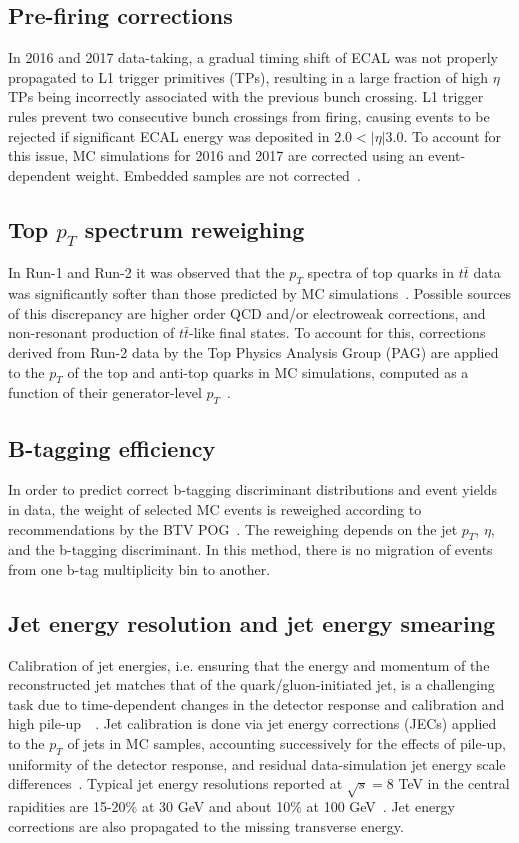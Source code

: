 \subsection{Pre-firing corrections}
In 2016 and 2017 data-taking, a gradual timing shift of ECAL was not properly propagated to L1 trigger primitives (TPs), resulting in a large fraction of high $\eta$ TPs being incorrectly associated with the previous bunch crossing. L1 trigger rules prevent two consecutive bunch crossings from firing, causing events to be rejected if significant ECAL energy was deposited in $2.0 < |\eta| 3.0$. To account for this issue, MC simulations for 2016 and 2017 are corrected using an event-dependent weight. Embedded samples are not corrected~\cite{CMS-HIG-19-010}.

\subsection{Top \texorpdfstring{$p_{T}$}{pT} spectrum reweighing}
In Run-1 and Run-2 it was observed that the $p_{T}$ spectra of top quarks in $t\bar{t}$ data was significantly softer than those predicted by MC simulations~\cite{twiki_Top_pt_reweighing}. Possible sources of this discrepancy are higher order QCD and/or electroweak corrections, and non-resonant production of $t\bar{t}$-like final states. To account for this, corrections derived from Run-2 data by the Top Physics Analysis Group (PAG) are applied to the $p_{T}$ of the top and anti-top quarks in MC simulations, computed as a function of their generator-level $p_{T}$~\cite{twiki_Top_pt_reweighing}.

\subsection{B-tagging efficiency}
In order to predict correct b-tagging discriminant distributions and event yields in data, the weight of selected MC events is reweighed according to recommendations by the BTV POG~\cite{twiki_btag_SF_methods}. The reweighing depends on the jet $p_{T}$, $\eta$, and the b-tagging discriminant. In this method, there is no migration of events from one b-tag multiplicity bin to another.

\subsection{Jet energy resolution and jet energy smearing}
Calibration of jet energies, i.e. ensuring that the energy and momentum of the reconstructed jet matches that of the quark/gluon-initiated jet, is a challenging task due to time-dependent changes in the detector response and calibration and high pile-up~\cite{CMS-JME-13-004}~\cite{proceedings-Agarwal:2022txa}. Jet calibration is done via jet energy corrections (JECs) applied to the $p_{T}$ of jets in MC samples, accounting successively for the effects of pile-up, uniformity of the detector response, and residual data-simulation jet energy scale differences~\cite{twiki_JetResolution_JEC}. Typical jet energy resolutions reported at $\sqrt{s} = 8$ TeV in the central rapidities are 15-20\% at 30 GeV and about 10\% at 100 GeV~\cite{CMS-JME-13-004}. Jet energy corrections are also propagated to the missing transverse energy.

